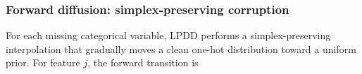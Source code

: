 \documentclass[times, review, 10pt]{elsarticle}
\begin{document}










\subsubsection{Forward diffusion: simplex-preserving corruption}

For each missing categorical variable, LPDD performs a simplex-preserving
interpolation that gradually moves a clean one-hot distribution toward a
uniform prior. For feature $j$, the forward transition is
\end{document}

